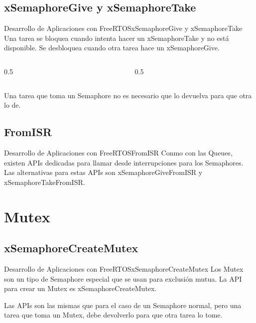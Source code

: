 \documentclass[aspectratio=169, xcolor=dvipsnames]{beamer}
\begin{document}
\subsection{xSemaphoreGive y xSemaphoreTake}
\begin{frame}{Desarrollo de Aplicaciones con FreeRTOS}{xSemaphoreGive y xSemaphoreTake}
Una tarea se bloquea cuando intenta hacer un \textcolor{myblue}{xSemaphoreTake} y no está disponible. Se desbloquea cuando otra tarea hace un \textcolor{myblue}{xSemaphoreGive}.\newline
\begin{columns}
\begin{column}{0.5\textwidth}

\end{column}
\begin{column}{0.5\textwidth}

\end{column}
\end{columns}
Una tarea que toma un Semaphore no es necesario que lo devuelva para que otra lo de.
\end{frame}

\subsection{FromISR}
\begin{frame}{Desarrollo de Aplicaciones con FreeRTOS}{FromISR}
Conmo con las Queues, existen APIs dedicadas para llamar desde interrupciones para los Semaphores.\newline
Las alternativas para estas APIs son \textcolor{myblue}{xSemaphoreGiveFromISR} y \textcolor{myblue}{xSemaphoreTakeFromISR}.\newline

\end{frame}

\section{Mutex}
\subsection{xSemaphoreCreateMutex}
\begin{frame}{Desarrollo de Aplicaciones con FreeRTOS}{xSemaphoreCreateMutex}
Los Mutex son un tipo de Semaphore especial que se usan para exclusión mutua.\newline
La API para crear un Mutex es \textcolor{myblue}{xSemaphoreCreateMutex}.\newline

Las APIs son las mismas que para el caso de un Semaphore normal, pero una tarea que toma un Mutex, debe devolverlo para que otra tarea lo tome.\newline
\end{frame}
\end{document}
